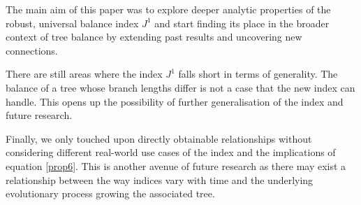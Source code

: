 The main aim of this paper was to explore deeper analytic properties of the robust, universal balance index $J^1$ and start finding its place in the broader context of tree balance by extending past results and uncovering new connections. \par
There are still areas where the index $J^1$ falls short in terms of generality. The balance of a tree whose branch lengths differ is not a case that the new index can handle. This opens up the possibility of further generalisation of the index and future research.\par
Finally, we only touched upon directly obtainable relationships without considering different real-world use cases of the index and the implications of equation \eqref{prop6}. This is another avenue of future research as there may exist a relationship between the way indices vary with time and the underlying evolutionary process growing the associated tree.

